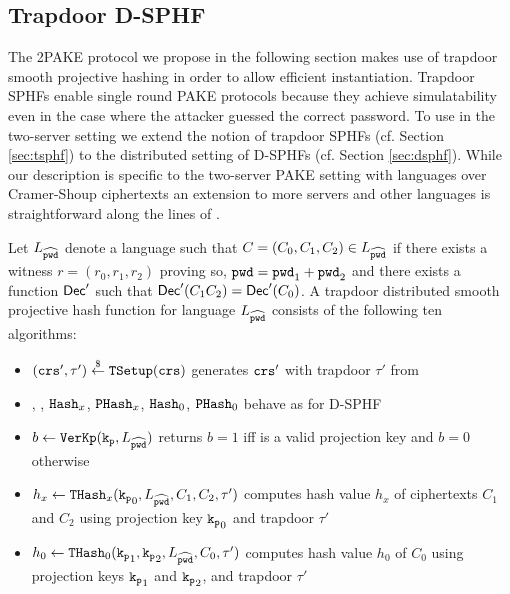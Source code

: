 \subsection{Trapdoor D-SPHF}\label{sec:tdsphf}
The 2PAKE protocol we propose in the following section makes use of trapdoor smooth projective hashing in order to allow efficient instantiation.
Trapdoor SPHFs enable single round PAKE protocols because they achieve simulatability even in the case where the attacker guessed the correct password.
To use \TSPHF in the two-server setting we extend the notion of trapdoor SPHFs (cf. Section \ref{sec:tsphf}) to the distributed setting of D-SPHFs (cf. Section \ref{sec:dsphf}).
While our description is specific to the two-server PAKE setting with languages over Cramer-Shoup ciphertexts an extension to more servers and other languages is straightforward along the lines of \DSPHF.

\begin{definition}[TD-SPHF]\label{def:tdsphf}
Let $L_{\widehat{\mathtt{pwd}}}$ denote a language such that $C=(C_0,C_1,C_2)\in L_{\widehat{\mathtt{pwd}}}$ if there exists a witness $r=(r_0,r_1,r_2)$ proving so, $\mathtt{pwd}=\mathtt{pwd}_1+\mathtt{pwd}_2$ and there exists a function $\mathsf{Dec}'$ such that $\mathsf{Dec}'(C_1 C_2)=\mathsf{Dec}'(C_0)$.
A trapdoor distributed smooth projective hash function for language $L_{\widehat{\mathtt{pwd}}}$ consists of the following ten algorithms:

\begin{itemize}
	\item $(\mathtt{crs}',\tau')\stackrel{\$}{\gets}\mathtt{TSetup}(\mathtt{crs})$ generates $\mathtt{crs}'$ with trapdoor $\tau'$ from \crs

	\item \HKGen, \PKGen, $\mathtt{Hash}_x$, $\mathtt{PHash}_x$, $\mathtt{Hash}_0$, $\mathtt{PHash}_0$ behave as for D-SPHF
	
	\item $b\gets\mathtt{VerKp}(\mathtt{k_p},L_{\widehat{\mathtt{pwd}}})$ returns $b=1$ iff \hp is a valid projection key and $b=0$ otherwise
	
	\item $h_x\gets\mathtt{THash}_x(\mathtt{k_p}_0,L_{\widehat{\mathtt{pwd}}},C_1,C_2,\tau')$ computes hash value $h_x$ of ciphertexts $C_1$ and $C_2$ using projection key $\mathtt{k_p}_0$ and trapdoor $\tau'$
	
	\item $h_0\gets\mathtt{THash}_0(\mathtt{k_p}_1,\mathtt{k_p}_2,L_{\widehat{\mathtt{pwd}}},C_0,\tau')$ computes hash value $h_0$ of $C_0$ using projection keys $\mathtt{k_p}_1$ and $\mathtt{k_p}_2$, and trapdoor $\tau'$
\end{itemize}
\end{definition}


